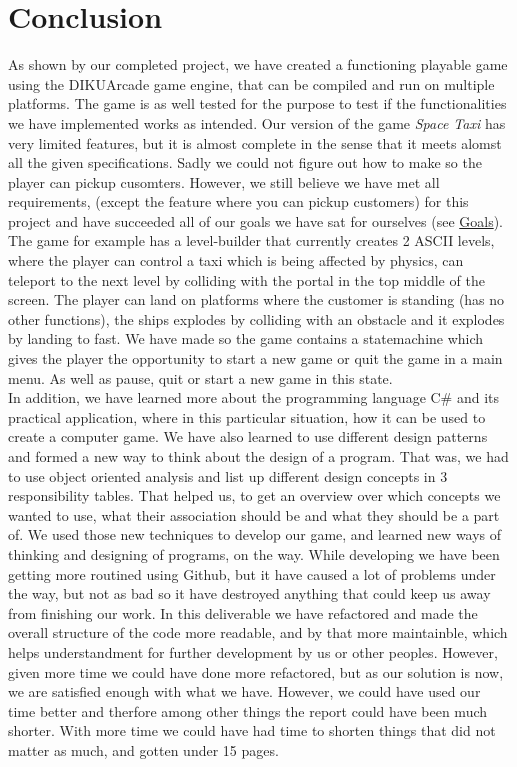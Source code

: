 \documentclass[../master.tex]{subfile}
\begin{document}
\section{Conclusion}
As shown by our completed project, we have created a functioning playable game using the DIKUArcade game engine, that can be compiled and run on multiple platforms. The game is as well tested for the purpose to test if the functionalities we have implemented works as intended. Our version of the game \textit{Space Taxi} has very limited features, but it is almost complete in the sense that it meets alomst all the given specifications. Sadly we could not figure out how to make so the player can pickup cusomters. However, we still believe we have met all requirements, (except the feature where you can pickup customers) for this project and have succeeded all of our goals we have sat for ourselves (see \hyperref[sec:Goals]{Goals}).\\
 
The game for example has a level-builder that currently creates 2 ASCII levels, where the player can control a taxi which is being affected by physics, can teleport to the next level by colliding with the portal in the top middle of the screen. The player can land on platforms where the customer is standing (has no other functions), the ships explodes by colliding with an obstacle and it explodes by landing to fast. We have made so the game contains a statemachine which gives the player the opportunity to start a new game or quit the game in a main menu. As well as pause, quit or start a new game in this state.\\

In addition, we have learned more about the programming language C\# and its practical application, where in this particular situation, how it can be used to create a computer game. We have also learned to use different design patterns and formed a new way to think about the design of a program. That was, we had to use object oriented analysis and list up different design concepts in 3 responsibility tables. That helped us, to get an overview over which concepts we wanted to use, what their association should be and what they should be a part of. We used those new techniques to develop our game, and learned new ways of thinking and designing of programs, on the way. While developing we have been getting more routined using Github, but it have caused a lot of problems under the way, but not as bad so it have destroyed anything that could keep us away from finishing our work. In this deliverable we have refactored and made the overall structure of the code more readable, and by that more maintainble, which helps understandment for further development by us or other peoples. However, given more time we could have done more refactored, but as our solution is now, we are satisfied enough with what we have. However, we could have used our time better and therfore among other things the report could have been much shorter. With more time we could have had time to shorten things that did not matter as much, and gotten under 15 pages.\\
\end{document}
